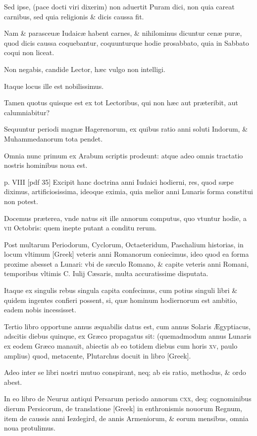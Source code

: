 \begin{parnumbers}
Sed ipse, (pace docti viri dixerim) non
aduertit Puram dici, non quia careat carnibus, sed quia religionis
\& dicis caussa fit.

Nam \& parasceuæ Iudaicæ habent carnes,
\& nihilominus dicuntur cenæ puræ, quod dicis caussa coquebantur,
coquunturque hodie prosabbato, quia in Sabbato
coqui non liceat.

Non negabis, candide Lector, hæc vulgo non intelligi.

Itaque locus ille est nobilissimus. 

Tamen quotus quisque est ex tot Lectoribus, qui non hæc aut præteribit,
aut calumniabitur?

Sequuntur periodi magnæ Hagerenorum,
ex quibus ratio anni soluti Indorum, \& Muhammedanorum
tota pendet.

Omnia nunc primum ex Arabum scriptis
prodeunt: atque adeo omnis tractatio nostris hominibus
noua est.

\clearpage
p. VIII [pdf 35]
Excipit hanc doctrina anni Iudaici hodierni, res, quod
sæpe diximus, artificiosissima, ideoque eximia, quia melior
anni Lunaris forma constitui non potest.

Docemus præterea, vnde
natus sit ille annorum computus, quo vtuntur hodie, a \textsc{vii} Octobris:
quem inepte putant a conditu rerum.

Post multarum Periodorum,
Cyclorum, Octaeteridum, Paschalium historias, in locum vltimum
\textgreek{[Greek]} veteris anni Romanorum coniecimus, ideo
quod ea forma proxime abesset a Lunari: vbi de sæculo Romano,
\& capite veteris anni Romani, temporibus vltimis C. Iulij Cæsaris,
multa accuratissime disputata.

Itaque ex singulis rebus singula capita
confecimus, cum potius singuli libri \& quidem ingentes confieri
possent, si, quæ hominum hodiernorum est ambitio, eadem nobis
incessisset.

Tertio libro opportune annus æquabilis datus est,
cum annus Solaris Ægyptiacus, adscitis diebus quinque, ex Græco
propagatus sit: (quemadmodum annus Lunaris ex eodem Græco
manauit, abiectis ab eo totidem diebus cum horis \textsc{xv}, paulo amplius)
quod, metacente, Plutarchus docuit in libro \textgreek{[Greek]}.

Adeo inter se libri nostri mutuo conspirant, neq; ab eis ratio,
methodus, \& ordo abest.

In eo libro de Neuruz antiqui Persarum
periodo annorum \textsc{cxx}, deq; cognominibus dierum Persicorum,
de translatione \textgreek{[Greek]} in enthronismis nouorum Regnum,
item de caussis anni Iezdegird, de annis Armeniorum, \& eorum
mensibus, omnia noua protulimus. 


\end{parnumbers}

